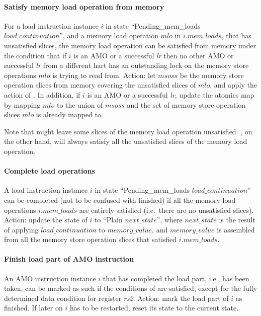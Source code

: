\paragraph{Satisfy memory load operation from memory}\label{omm:sat_from_mem}
For a load instruction instance $i$ in state ``{\sc Pending\_mem\_loads} $load\_continuation$'', and a memory load operation $mlo$ in $i.mem\_loads$, that has unsatisfied slices, the memory load operation can be satisfied from memory under the condition that if $i$ is an AMO or a successful {\em lr} then no other AMO or successful {\em lr} from a different hart has an outstanding lock on the memory store operations $mlo$ is trying to read from.
Action: let $msoss$ be the memory store operation slices from memory covering the unsatisfied slices of $mlo$, and apply the action of .
In addition, if $i$ is an AMO or a successful {\em lr}, update the atomics map by mapping $mlo$ to the union of $msoss$ and the set of memory store operation slices $mlo$ is already mapped to.

\begin{commentary}
Note that  might leave some slices of the memory load operation unsatisfied.
, on the other hand, will always satisfy all the unsatisfied slices of the memory load operation.
\end{commentary}


\paragraph{Complete load operations}\label{omm:complete_loads}
A load instruction instance $i$ in state ``{\sc Pending\_mem\_loads} $load\_continuation$'' can be completed (not to be confused with finished) if all the memory load operations $i.mem\_loads$ are entirely satisfied (i.e.~there are no unsatisfied slices).
Action: update the state of $i$ to ``{\sc Plain} $next\_state$'', where $next\_state$ is the result of applying $load\_continuation$ to $memory\_value$, and $memory\_value$ is assembled from all the memory store operation slices that satisfied $i.mem\_loads$.


\paragraph{Finish load part of AMO instruction}\label{omm:finish_load_part}
An AMO instruction instance $i$ that has completed the load part, i.e.,  has been taken, can be marked as such if the conditions of  are satisfied, except for the fully determined data condition for register {\em rs2}.
Action: mark the load part of $i$ as finished. If later on $i$ has to be restarted, reset its state to the current state.



